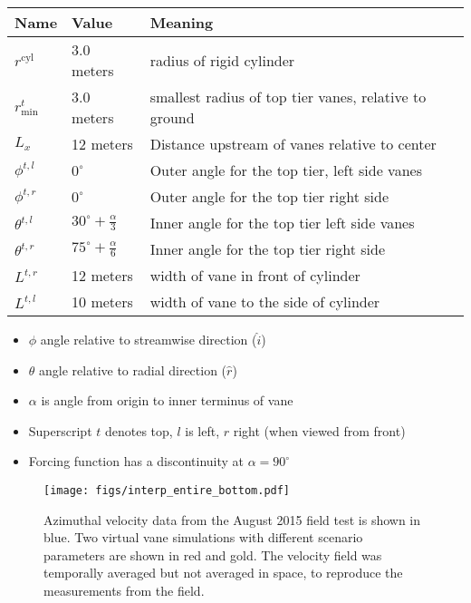 \begin{table}[]
\centering
\begin{tabular}{lll}
Name                        & Value & Meaning                    \\
 \hline
$r^{\text{cyl}}$            &  3.0 meters & radius of rigid cylinder \\
$r^t_{\text{min}}$          &  3.0 meters & smallest radius of top tier
	 vanes, relative to ground \\
$L_x$                       &  12 meters  & Distance upstream
	 of vanes relative to center\\
$\phi^{t,l}$ &  $0^{\circ}$   & Outer angle for the top tier, left side vanes \\
$\phi^{t,r}$   &  $0^{\circ}$   & Outer angle for the top tier right side \\
$\theta^{t,l}$ &   $30^{\circ} +\frac{\alpha}{3}$  & Inner angle for the top tier left side vanes\\
$\theta^{t,r}$   &   $75^{\circ} +\frac{\alpha}{6}$   & Inner angle for the top tier right side \\
$L^{t,r}$                   &  12 meters  & width of vane in front of cylinder \\
$L^{t,l}$                   &  10 meters  & width of vane to the side of cylinder \\
\end{tabular}
\end{table}

\begin{itemize}
 \item $\phi$  angle relative to streamwise direction ($\hat i$)
 \item $\theta$ angle relative to radial direction ($\hat r$)
 \item $\alpha$ is angle from origin to inner terminus of vane
 \item Superscript $t$ denotes top, $l$ is left, $r$ right (when viewed
       from front)
 \item Forcing function has a discontinuity at $\alpha=90^{\circ}$
\end{itemize}


 \begin{figure}[!htb]
  \begin{center}
   \texttt{[image: figs/interp\_entire\_bottom.pdf]}
   \caption{Azimuthal velocity data from the August 2015 field test is
   shown in blue. Two virtual vane simulations with different scenario
   parameters are shown in red and gold. The velocity field was
   temporally averaged but not averaged in space, to reproduce
   the measurements from the field.}
   \label{fig:bottom_design}
  \end{center}
 \end{figure}

